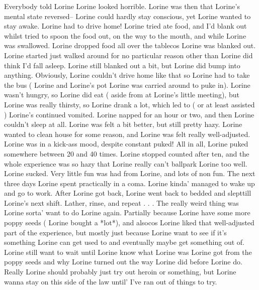 \documentclass[12pt]{book}
\begin{document}
Everybody told Lorine Lorine looked horrible. Lorine was then that Lorine's mental state reversed-- Lorine could hardly stay conscious, yet Lorine wanted to stay awake. Lorine had to drive home! Lorine tried ate food, and I'd blank out whilst tried to spoon the food out, on the way to the mouth, and while Lorine was swallowed. Lorine dropped food all over the tablecos Lorine was blanked out. Lorine started just walked around for no particular reason other than Lorine did think I'd fall asleep. Lorine still blanked out a bit, but Lorine did bump into anything. Obviously, Lorine couldn't drive home like that so Lorine had to take the bus ( Lorine and Lorine's pot Lorine was carried around to puke in). Lorine wasn't hungry, so Lorine did eat ( aside from at Lorine's little meeting), but Lorine was really thirsty, so Lorine drank a lot, which led to ( or at least assisted ) Lorine's continued vomited. Lorine napped for an hour or two, and then Lorine couldn't sleep at all. Lorine was felt a bit better, but still pretty hazy. Lorine wanted to clean house for some reason, and Lorine was felt really well-adjusted. Lorine was in a kick-ass mood, despite constant puked! All in all, Lorine puked somewhere between 20 and 40 times. Lorine stopped counted after ten, and the whole experience was so hazy that Lorine really can't ballpark Lorine too well. Lorine sucked. Very little fun was had from Lorine, and lots of non fun. The next three days Lorine spent practically in a coma. Lorine kinda' managed to wake up and go to work. After Lorine got back, Lorine went back to bedded and slepttill Lorine's next shift. Lather, rinse, and repeat . . .  The really weird thing was Lorine sorta' want to do Lorine again. Partially because Lorine have some more poppy seeds ( Lorine bought a *lot*), and alsocos Lorine liked that well-adjusted part of the experience, but mostly just because Lorine want to see if it's something Lorine can get used to and eventually maybe get something out of. Lorine still want to wait until Lorine know what Lorine was Lorine got from the poppy seeds and why Lorine turned out the way Lorine did before Lorine do. Really Lorine should probably just try out heroin or something, but Lorine wanna stay on this side of the law until' I've ran out of things to try.
\end{document}
